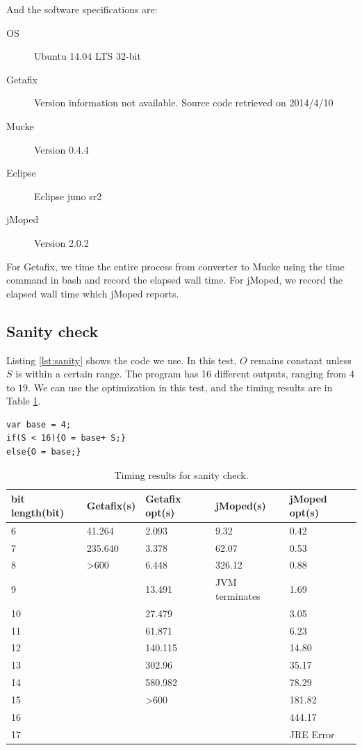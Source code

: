 And the software specifications are:
\begin{description}
  \item[OS] Ubuntu 14.04 LTS 32-bit
  \item[Getafix] Version information not available. Source code retrieved on 2014/4/10
  \item[Mucke] Version 0.4.4
  \item[Eclipse] Eclipse juno sr2
  \item[jMoped] Version 2.0.2
\end{description}

For Getafix, we time the entire process from converter to Mucke using the time command in bash and record the elapsed wall time. For jMoped, we record the elapsed wall time which jMoped reports.

\subsection{Sanity check}
Listing \ref{lst:sanity} shows the code we use. In this test, $O$ remains constant unless $S$ is within a certain range. The program has 16 different outputs, ranging from $4$ to $19$. We can use the optimization in this test, and the timing results are in Table \ref{tbl:sanity}.

\lstset{language=C}  
\begin{lstlisting}[float=!h, caption={Sanity check test program.},label=lst:sanity]
var base = 4;
if(S < 16){O = base+ S;}
else{O = base;}
\end{lstlisting}

\begin{table}[!h]
\begin{center}
\begin{tabular}{|l|l|l|l|l|}
\hline
bit length(bit) & Getafix(s) & Getafix opt(s) & jMoped(s) & jMoped opt(s) \\ \hline
6 & 41.264 & 2.093 & 9.32 & 0.42 \\ \hline
7 & 235.640 & 3.378 & 62.07 & 0.53 \\ \hline
8 & \textgreater600 & 6.448 & 326.12 & 0.88 \\ \hline
9 &  & 13.491 & JVM terminates & 1.69 \\ \hline
10 &  & 27.479 &  & 3.05 \\ \hline
11 &  & 61.871 &  & 6.23 \\ \hline
12 &  & 140.115 &  & 14.80 \\ \hline
13 &  & 302.96 &  & 35.17 \\ \hline
14 &  & 580.982 &  & 78.29 \\ \hline
15 &  & \textgreater600 &  & 181.82 \\ \hline
16 &  &  &  & 444.17 \\ \hline
17 &  &  &  & JRE Error \\ \hline
\end{tabular}
\end{center}
\caption{Timing results for sanity check.}
\label{tbl:sanity}
\end{table}

